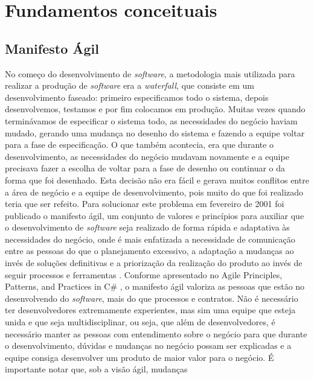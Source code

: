 \chapter{Fundamentos conceituais}
  \section{Manifesto Ágil}
    No começo do desenvolvimento de \textit{software}, a metodologia mais utilizada
    para realizar a produção de \textit{software} era a \textit{waterfall}, que
    consiste em um desenvolvimento faseado: primeiro especificamos todo o sistema,
    depois desenvolvemos, testamos e por fim colocamos em produção. Muitas vezes
    quando terminávamos de especificar o sistema todo, as necessidades do
    negócio haviam mudado, gerando uma mudança no desenho do sistema e fazendo a
    equipe voltar para a fase de especificação. O que também acontecia, era que
    durante o desenvolvimento, as necessidades do negócio mudavam novamente e
    a equipe precisava fazer a escolha de voltar para a fase de desenho ou continuar
    o da forma que foi desenhado. Esta decisão não era fácil e gerava muitos conflitos
    entre a área de negócio e a equipe de desenvolvimento, pois muito do que foi
    realizado teria que ser refeito. \newline
    Para solucionar este problema em fevereiro de 2001 foi publicado o manifesto
    ágil, um conjunto de valores e princípios para auxiliar que o desenvolvimento de
    \textit{software} seja realizado de forma rápida e adaptativa às necessidades
    do negócio, onde é mais enfatizada a necessidade de comunicação entre as pessoas
    do que o planejamento excessivo, a adaptação a mudanças ao invés de soluções
    definitivas e a priorização da realização do produto ao invés de seguir processos
    e ferramentas \cite{manifestoAgile}. \newline
    Conforme apresentado no Agile Principles, Patterns, and Practices in C\#
    \cite{martin2007agile}, o manifesto ágil valoriza as pessoas que estão
    no desenvolvendo do \textit{software}, mais do que processos e contratos.
    Não é necessário ter desenvolvedores extremamente experientes, mas sim
    uma equipe que esteja unida e que seja multidisciplinar, ou seja, que além de
    desenvolvedores, é necessário manter as pessoas com entendimento sobre o
    negócio para que durante o desenvolvimento, dúvidas e mudanças no negócio
    possam ser explicadas e a equipe consiga desenvolver um produto de maior
    valor para o negócio. É importante notar que, sob a visão ágil, mudanças
